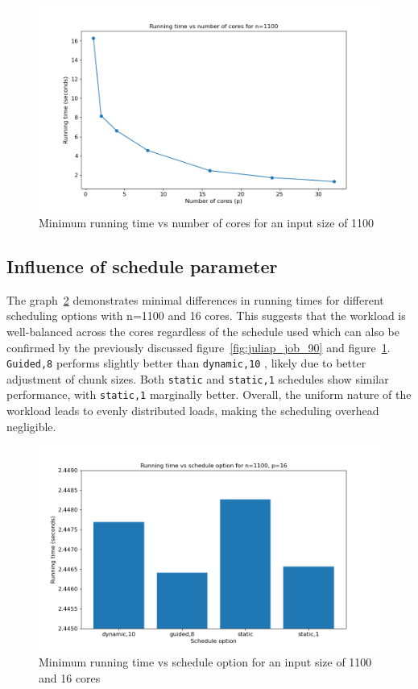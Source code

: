 \documentclass[a4paper,%
7pt,%
DIV12,
headsepline,%
headings=normal,
]{scrartcl}
\begin{document}
\begin{figure}[htbp]
    \centering
    \includegraphics[width=1\linewidth]{./juliap_job_1100.png}
    \caption{Minimum running time vs number of cores for an input size of 1100}
    \label{fig:juliap_job_1100}
\end{figure}

\subsection{Influence of schedule parameter}

The graph~\ref{fig:juliap2_job} demonstrates minimal differences in running times for different scheduling options with n=1100 and 16 cores. This suggests that the workload is well-balanced across the cores regardless of the schedule used which can also be confirmed by the previously discussed figure~\ref{fig:juliap_job_90} and figure~\ref{fig:juliap_job_1100}.  \texttt{Guided,8} performs slightly better than \texttt{dynamic,10} , likely due to better adjustment of chunk sizes. Both \texttt{static} and \texttt{static,1} schedules show similar performance, with \texttt{static,1} marginally better. Overall, the uniform nature of the workload leads to evenly distributed loads, making the scheduling overhead negligible.

\begin{figure}[htbp]
    \centering
    \includegraphics[width=1\linewidth]{./juliap2_job.png}
    \caption{Minimum running time vs schedule option for an input size of 1100 and 16 cores}
    \label{fig:juliap2_job}
\end{figure}
\end{document}
